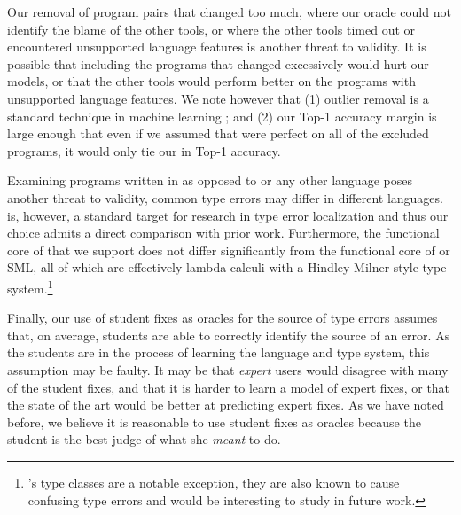 Our removal of program pairs that changed too much, where our oracle
could not identify the blame of the other tools, or where the other
tools timed out or encountered unsupported language features is another
threat to validity.
%
It is possible that including the programs that changed excessively
would hurt our models, or that the other tools would perform
better on the programs with unsupported language features.
%
We note however that
%
(1) outlier removal is a standard technique in machine learning
; and
%
(2) our Top-1 accuracy margin is large enough that even if we assumed
that \sherrloc were perfect on all of the excluded programs, it would
only tie our \hiddenFH in Top-1 accuracy.
%

Examining programs written in \ocaml as opposed to \haskell or any other
language poses another threat to validity, common type errors may differ
in different languages.
%
\ocaml is, however, a standard target for research in type error
localization and thus our choice admits a direct comparison with prior
work.
%
Furthermore, the functional core of \ocaml that we support does not
differ significantly from the functional core of \haskell or SML, all of
which are effectively lambda calculi with a Hindley-Milner-style type
system.\footnote{\haskell's type classes are a notable exception, they
  are also known to cause confusing type errors and would be interesting
  to study in future work.}

Finally, our use of student fixes as oracles for the source of type
errors assumes that, on average, students are able to correctly identify
the source of an error.
%
As the students are in the process of learning the language and type
system, this assumption may be faulty.
%
It may be that \emph{expert} users would disagree with many of the
student fixes, and that it is harder to learn a model of expert fixes,
or that the state of the art would be better at predicting expert fixes.
%
As we have noted before, we believe it is reasonable to use student
fixes as oracles because the student is the best judge of what she
\emph{meant} to do.


